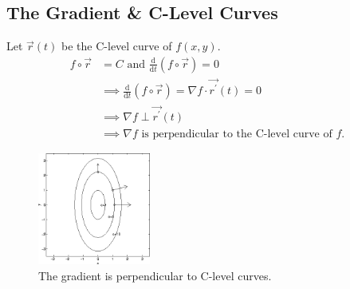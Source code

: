\subsection{The Gradient \& C-Level Curves}
\noindent
Let $\vec{r}(t)$ be the C-level curve of $f(x, y)$.
\begin{align*}
f\circ\vec{r} &= C  \text{ and } \frac{\mathrm{d}}{\mathrm{d}t}(f\circ\vec{r}) = 0 \\
	&\implies \frac{\mathrm{d}}{\mathrm{d}t}(f\circ\vec{r}) = \nabla f\cdot\vec{r^\prime}(t) = 0 \\
	&\implies \nabla f\perp\vec{r^\prime}(t) \\
	&\implies \nabla f \text{ is perpendicular to the C-level curve of } f.
\end{align*}

\begin{figure}[H]
	\centering
	\includegraphics[width=0.33\textwidth]{./differentialMultivariableCalculus/grad_c_level.png}
	\caption{The gradient is perpendicular to C-level curves.}
\end{figure}